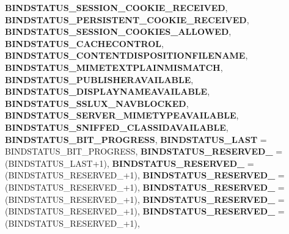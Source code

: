 \begin{DoxyCompactItemize}
\newline
{\bfseries B\+I\+N\+D\+S\+T\+A\+T\+U\+S\+\_\+\+S\+E\+S\+S\+I\+O\+N\+\_\+\+C\+O\+O\+K\+I\+E\+\_\+\+R\+E\+C\+E\+I\+V\+ED}, 
{\bfseries B\+I\+N\+D\+S\+T\+A\+T\+U\+S\+\_\+\+P\+E\+R\+S\+I\+S\+T\+E\+N\+T\+\_\+\+C\+O\+O\+K\+I\+E\+\_\+\+R\+E\+C\+E\+I\+V\+ED}, 
{\bfseries B\+I\+N\+D\+S\+T\+A\+T\+U\+S\+\_\+\+S\+E\+S\+S\+I\+O\+N\+\_\+\+C\+O\+O\+K\+I\+E\+S\+\_\+\+A\+L\+L\+O\+W\+ED}, 
{\bfseries B\+I\+N\+D\+S\+T\+A\+T\+U\+S\+\_\+\+C\+A\+C\+H\+E\+C\+O\+N\+T\+R\+OL}, 
\newline
{\bfseries B\+I\+N\+D\+S\+T\+A\+T\+U\+S\+\_\+\+C\+O\+N\+T\+E\+N\+T\+D\+I\+S\+P\+O\+S\+I\+T\+I\+O\+N\+F\+I\+L\+E\+N\+A\+ME}, 
{\bfseries B\+I\+N\+D\+S\+T\+A\+T\+U\+S\+\_\+\+M\+I\+M\+E\+T\+E\+X\+T\+P\+L\+A\+I\+N\+M\+I\+S\+M\+A\+T\+CH}, 
{\bfseries B\+I\+N\+D\+S\+T\+A\+T\+U\+S\+\_\+\+P\+U\+B\+L\+I\+S\+H\+E\+R\+A\+V\+A\+I\+L\+A\+B\+LE}, 
{\bfseries B\+I\+N\+D\+S\+T\+A\+T\+U\+S\+\_\+\+D\+I\+S\+P\+L\+A\+Y\+N\+A\+M\+E\+A\+V\+A\+I\+L\+A\+B\+LE}, 
\newline
{\bfseries B\+I\+N\+D\+S\+T\+A\+T\+U\+S\+\_\+\+S\+S\+L\+U\+X\+\_\+\+N\+A\+V\+B\+L\+O\+C\+K\+ED}, 
{\bfseries B\+I\+N\+D\+S\+T\+A\+T\+U\+S\+\_\+\+S\+E\+R\+V\+E\+R\+\_\+\+M\+I\+M\+E\+T\+Y\+P\+E\+A\+V\+A\+I\+L\+A\+B\+LE}, 
{\bfseries B\+I\+N\+D\+S\+T\+A\+T\+U\+S\+\_\+\+S\+N\+I\+F\+F\+E\+D\+\_\+\+C\+L\+A\+S\+S\+I\+D\+A\+V\+A\+I\+L\+A\+B\+LE}, 
{\bfseries B\+I\+N\+D\+S\+T\+A\+T\+U\+S\+\_\+B\+I\+T\+\_\+\+P\+R\+O\+G\+R\+E\+SS}, 
\newline
{\bfseries B\+I\+N\+D\+S\+T\+A\+T\+U\+S\+\_\+\+L\+A\+ST} = B\+I\+N\+D\+S\+T\+A\+T\+U\+S\+\_\+B\+I\+T\+\_\+\+P\+R\+O\+G\+R\+E\+SS, 
{\bfseries B\+I\+N\+D\+S\+T\+A\+T\+U\+S\+\_\+\+R\+E\+S\+E\+R\+V\+E\+D\+\_} = (B\+I\+N\+D\+S\+T\+A\+T\+U\+S\+\_\+\+L\+A\+S\+T+1), 
{\bfseries B\+I\+N\+D\+S\+T\+A\+T\+U\+S\+\_\+\+R\+E\+S\+E\+R\+V\+E\+D\+\_} = (B\+I\+N\+D\+S\+T\+A\+T\+U\+S\+\_\+\+R\+E\+S\+E\+R\+V\+E\+D\+\_+1), 
{\bfseries B\+I\+N\+D\+S\+T\+A\+T\+U\+S\+\_\+\+R\+E\+S\+E\+R\+V\+E\+D\+\_} = (B\+I\+N\+D\+S\+T\+A\+T\+U\+S\+\_\+\+R\+E\+S\+E\+R\+V\+E\+D\+\_+1), 
\newline
{\bfseries B\+I\+N\+D\+S\+T\+A\+T\+U\+S\+\_\+\+R\+E\+S\+E\+R\+V\+E\+D\+\_} = (B\+I\+N\+D\+S\+T\+A\+T\+U\+S\+\_\+\+R\+E\+S\+E\+R\+V\+E\+D\+\_+1), 
{\bfseries B\+I\+N\+D\+S\+T\+A\+T\+U\+S\+\_\+\+R\+E\+S\+E\+R\+V\+E\+D\+\_} = (B\+I\+N\+D\+S\+T\+A\+T\+U\+S\+\_\+\+R\+E\+S\+E\+R\+V\+E\+D\+\_+1), 
{\bfseries B\+I\+N\+D\+S\+T\+A\+T\+U\+S\+\_\+\+R\+E\+S\+E\+R\+V\+E\+D\+\_} = (B\+I\+N\+D\+S\+T\+A\+T\+U\+S\+\_\+\+R\+E\+S\+E\+R\+V\+E\+D\+\_+1), 

\end{DoxyCompactItemize}
